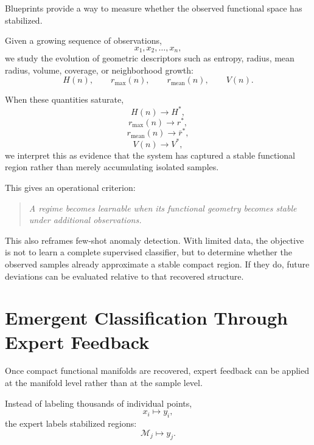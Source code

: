 \documentclass[11pt,a4paper]{article}
\begin{document}
Blueprints provide a way to measure whether the observed functional space has stabilized.

Given a growing sequence of observations,
\begin{equation}
    x_1,x_2,\ldots,x_n,
\end{equation}
we study the evolution of geometric descriptors such as entropy, radius, mean radius, volume, coverage, or neighborhood growth:
\begin{equation}
    H(n), \qquad r_{\max}(n), \qquad r_{\mathrm{mean}}(n), \qquad V(n).
\end{equation}

When these quantities saturate,
\begin{equation}
    H(n) \to H^*,
\end{equation}
\begin{equation}
    r_{\max}(n) \to r^*,
\end{equation}
\begin{equation}
    r_{\mathrm{mean}}(n) \to \bar{r}^*,
\end{equation}
\begin{equation}
    V(n) \to V^*,
\end{equation}
we interpret this as evidence that the system has captured a stable functional region rather than merely accumulating isolated samples.

This gives an operational criterion:

\begin{quote}
\emph{A regime becomes learnable when its functional geometry becomes stable under additional observations.}
\end{quote}

This also reframes few-shot anomaly detection. With limited data, the objective is not to learn a complete supervised classifier, but to determine whether the observed samples already approximate a stable compact region. If they do, future deviations can be evaluated relative to that recovered structure.

\section{Emergent Classification Through Expert Feedback}

Once compact functional manifolds are recovered, expert feedback can be applied at the manifold level rather than at the sample level.

Instead of labeling thousands of individual points,
\begin{equation}
    x_i \mapsto y_i,
\end{equation}
the expert labels stabilized regions:
\begin{equation}
    \mathcal{M}_j \mapsto y_j.
\end{equation}
\end{document}
